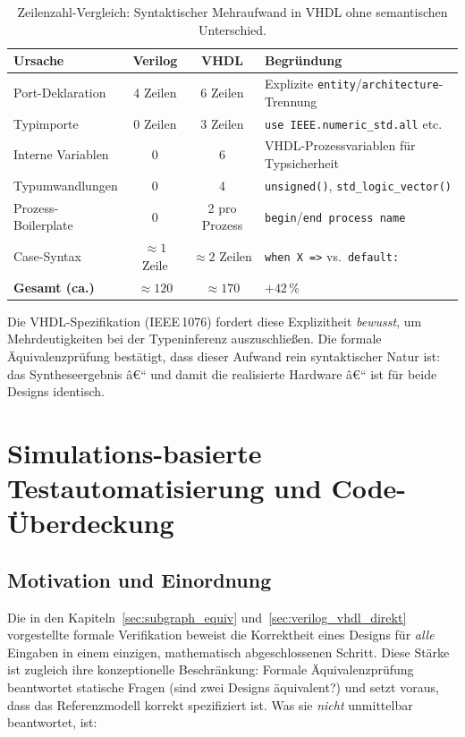 ﻿\documentclass[12pt,a4paper]{report}
\begin{document}
\begin{table}[H]
	\centering
	\small
	\begin{tabular}{|l|c|c|l|}
		\hline
		\textbf{Ursache} & \textbf{Verilog} & \textbf{VHDL} & \textbf{Begründung} \\
		\hline
		Port-Deklaration & 4 Zeilen & 6 Zeilen & Explizite \texttt{entity}/\texttt{architecture}-Trennung \\
		Typimporte       & 0 Zeilen & 3 Zeilen & \texttt{use IEEE.numeric\_std.all} etc.\ \\
		Interne Variablen & 0 & 6 & VHDL-Prozessvariablen für Typsicherheit \\
		Typumwandlungen  & 0 & 4 & \texttt{unsigned()}, \texttt{std\_logic\_vector()} \\
		Prozess-Boilerplate & 0 & 2 pro Prozess & \texttt{begin}/\texttt{end process name} \\
		Case-Syntax      & $\approx 1$ Zeile & $\approx 2$ Zeilen & \texttt{when X =>} vs.\ \texttt{default:} \\
		\hline
		\textbf{Gesamt (ca.)} & $\approx 120$ & $\approx 170$ & $+42\,\%$ \\
		\hline
	\end{tabular}
	\caption{Zeilenzahl-Vergleich: Syntaktischer Mehraufwand in VHDL ohne semantischen Unterschied.}
\end{table}

Die VHDL-Spezifikation (IEEE\,1076) fordert diese Explizitheit
\emph{bewusst}, um Mehrdeutigkeiten bei der Typeninferenz auszuschließen.
Die formale Äquivalenzprüfung bestätigt, dass dieser Aufwand rein syntaktischer
Natur ist: das Syntheseergebnis â€“ und damit die realisierte Hardware â€“ ist
für beide Designs identisch.

\chapter{Simulations-basierte Testautomatisierung und Code-Über\-deckung}
\label{sec:pyuvm_aoi}

\section{Motivation und Einordnung}

Die in den Kapiteln~\ref{sec:subgraph_equiv} und~\ref{sec:verilog_vhdl_direkt}
vorgestellte formale Verifikation beweist die Korrektheit eines Designs für
\emph{alle} Eingaben in einem einzigen, mathematisch abgeschlossenen Schritt.
Diese Stärke ist zugleich ihre konzeptionelle Beschränkung: Formale
Äquivalenzprüfung beantwortet statische Fragen (sind zwei Designs äquivalent?)
und setzt voraus, dass das Referenzmodell korrekt spezifiziert ist. Was sie
\emph{nicht} unmittelbar beantwortet, ist:
\end{document}

